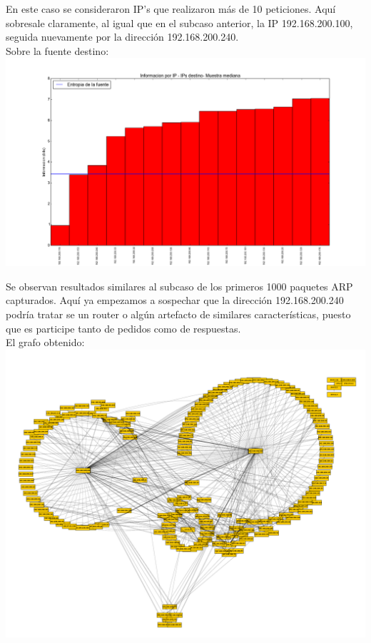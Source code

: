 \indent En este caso se consideraron IP's que realizaron más de 10 peticiones. Aquí sobresale claramente, al igual que en el subcaso anterior, la IP 192.168.200.100, seguida nuevamente por la dirección 192.168.200.240.\\

\indent Sobre la fuente destino:\\

\includegraphics[scale=0.5,clip=true,trim=100 0 0 0]{graphics/laburo_mediana_dst.png}

\indent  Se observan resultados similares al subcaso de los primeros 1000 paquetes ARP capturados. Aquí ya empezamos a sospechar que la dirección 192.168.200.240 podría tratar se un router o algún artefacto de similares características, puesto que es participe tanto de pedidos como de respuestas.\\

\indent El grafo obtenido:\\

\includegraphics[scale=0.5,clip=true,trim=20 0 0 0]{graphics/laburomediano.pdf}

